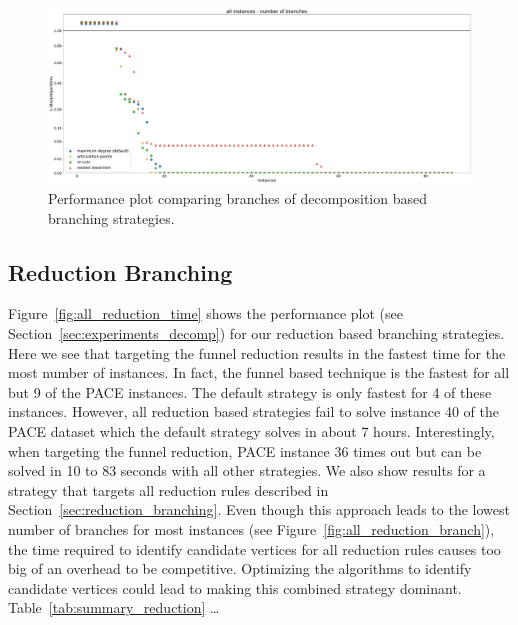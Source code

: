 \documentclass[a4paper,UKenglish,cleveref, autoref, thm-restate]{lipics-v2021}
\begin{document}
\begin{figure}[t]
  \includegraphics[width=\textwidth]{plots/all_decomposition_based_branch}
  \caption{Performance plot comparing branches of decomposition based branching strategies.}
  \label{fig:all_decomp_branch}
\end{figure}


\subsection{Reduction Branching}
Figure~\ref{fig:all_reduction_time} shows the performance plot (see
Section~\ref{sec:experiments_decomp}) for our reduction
based branching strategies. Here we see that targeting the funnel reduction
results in the fastest time for the most number of instances. In fact, the
funnel based technique is the fastest for all but 9 of the PACE instances. The
default strategy is only fastest for 4 of these instances. However, all
reduction based strategies fail to solve instance 40 of the PACE dataset which
the default strategy solves in about 7 hours.
Interestingly, when targeting the funnel reduction, PACE instance 36 times out
but can be solved in 10 to 83 seconds with all other
strategies. We also show results for a strategy that targets all reduction rules
described in Section~\ref{sec:reduction_branching}. Even though this approach
leads to the lowest number of branches for most instances (see Figure~\ref{fig:all_reduction_branch}), the time required to
identify candidate vertices for all reduction rules causes too big of an
overhead to be competitive. Optimizing the algorithms to identify candidate
vertices could lead to making this combined strategy
dominant. Table~\ref{tab:summary_reduction} \dots{}
\end{document}
